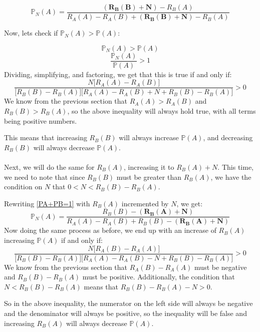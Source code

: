 \documentclass[english,12pt,a4paper,final]{article}
\begin{document}
\begin{equation*}
	\mathbb{P}_N(A)=\frac{\boldsymbol{(R_B(B)+N)}-R_B(A)}{R_A(A)-R_A(B)+\boldsymbol{(R_B(B)+N)}-R_B(A)}
\end{equation*}

Now, lets check if $\mathbb{P}_N(A) > \mathbb{P}(A)$:

\begin{equation*}
	\mathbb{P}_N(A) > \mathbb{P}(A)
\end{equation*}
\begin{equation*}
	\frac{\mathbb{P}_N(A)}{\mathbb{P}(A)} > 1
\end{equation*}
Dividing, simplifying, and factoring, we get that this is true if and only if:
\begin{equation*}
	\frac{N\big[R_A(A)-R_A(B)\big]}{\big[R_B(B)-R_B(A)\big]\big[R_A(A)-R_A(B)+N+R_B(B)-R_B(A)\big]} > 0
\end{equation*}
We know from the previous section that $R_A(A) > R_A(B)$ and $R_B(B) > R_B(A)$, so the above inequality will always hold true, with all terms being positive numbers.

This means that increasing $R_B(B)$ will always increase $\mathbb{P}(A)$, and decreasing $R_B(B)$ will always decrease $\mathbb{P}(A)$.
\\\\
Next, we will do the same for $R_B(A)$, increasing it to $R_B(A)+N$. This time, we need to note that since $R_B(B)$ must be greater than $R_B(A)$, we have the condition on $N$ that $0 < N < R_B(B)-R_B(A)$.

Rewriting \eqref{PA+PB=1} with $R_B(A)$ incremented by $N$, we get:
\begin{equation*}
	\mathbb{P}_N(A) = \frac{R_B(B)-\boldsymbol{(R_B(A)+N)}}{R_A(A)-R_A(B)+R_B(B)-\boldsymbol{(R_B(A)+N)}}
\end{equation*}
Now doing the same process as before, we end up with an increase of $R_B(A)$ increasing $\mathbb{P}(A)$ if and only if:
\begin{equation*}
	\frac{N\big[R_A(B)-R_A(A)\big]}{\big[R_B(B)-R_B(A)\big]\big[R_A(A)-R_A(B)-N+R_B(B)-R_B(A)\big]} > 0
\end{equation*}
We know from the previous section that $R_A(B)-R_A(A)$ must be negative and $R_B(B)-R_B(A)$ must be positive. Additionally, the condition that $N < R_B(B)-R_B(A)$ means that $R_B(B)-R_B(A)-N > 0$.

So in the above inequality, the numerator on the left side will always be negative and the denominator will always be positive, so the inequality will be false and increasing $R_B(A)$ will always decrease $\mathbb{P}(A)$.
\end{document}
